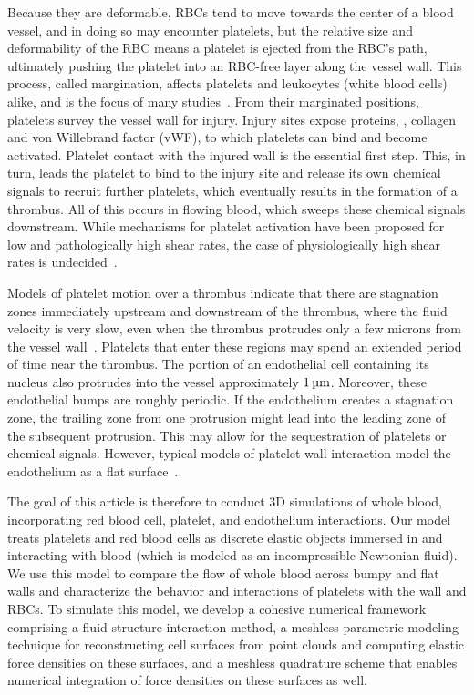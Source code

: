 Because they are deformable, RBCs tend to move towards the center of a blood vessel, and in doing so may encounter
platelets, but the relative size and deformability of the RBC means a platelet is ejected from the RBC's path,
ultimately pushing the platelet into an RBC-free layer along the vessel wall. This process, called margination,
affects platelets and leukocytes (white blood cells) alike, and is the focus of many studies~\cite{Freund:2007kx,
Erickson:2010ep, Erickson:2011cf, Zhao:2011do, Kumar:2011dd, Zhao:2012ggba, Fedosov:2012dy, Kumar:2012ie,
Fedosov:2013ul, Muller:2014is, Fedosov:2014bs, Vahidkhah:2014hy, Vahidkhah:2015ch, Mehrabadi:2016fn}. From their
marginated positions, platelets survey the vessel wall for injury. Injury sites expose proteins, ,
collagen and von Willebrand factor (vWF), to which platelets can bind and become activated. Platelet contact with
the injured wall is the essential first step.  This, in turn, leads the platelet to bind to the injury site and
release its own chemical signals to recruit further platelets, which eventually results in the formation of a
thrombus. All of this occurs in flowing blood, which sweeps these chemical signals downstream. While mechanisms
for platelet activation have been proposed for low and pathologically high shear rates, the case of
physiologically high shear rates is undecided~\cite{Fogelson:2015fb}.

Models of platelet motion over a thrombus indicate that there are stagnation zones immediately upstream and
downstream of the thrombus, where the fluid velocity is very slow, even when the thrombus protrudes only a few
microns from the vessel wall~\cite{Skorczewski:2013jn,Wang:2013gs}. Platelets that enter these regions may spend
an extended period of time near the thrombus. The portion of an endothelial cell containing its nucleus also
protrudes into the vessel approximately $1\um$. Moreover, these endothelial bumps are roughly periodic. If the
endothelium creates a stagnation zone, the trailing zone from one protrusion might lead into the leading zone of
the subsequent protrusion. This may allow for the sequestration of platelets or chemical signals. However, typical
models of platelet-wall interaction model the endothelium as a flat surface~\cite{Wu:2014gt,Vahidkhah:2015ch}.

The goal of this article is therefore to conduct 3D simulations of whole blood, incorporating red blood cell,
platelet, and endothelium interactions. Our model treats platelets and red blood cells as discrete elastic objects
immersed in and interacting with blood (which is modeled as an incompressible Newtonian fluid). We use this model
to compare the flow of whole blood across bumpy and flat walls and characterize the behavior and interactions of
platelets with the wall and RBCs. To simulate this model, we develop a cohesive numerical framework comprising a
fluid-structure interaction method, a meshless parametric modeling technique for reconstructing cell surfaces from
point clouds and computing elastic force densities on these surfaces, and a meshless quadrature scheme that
enables numerical integration of force densities on these surfaces as well.

